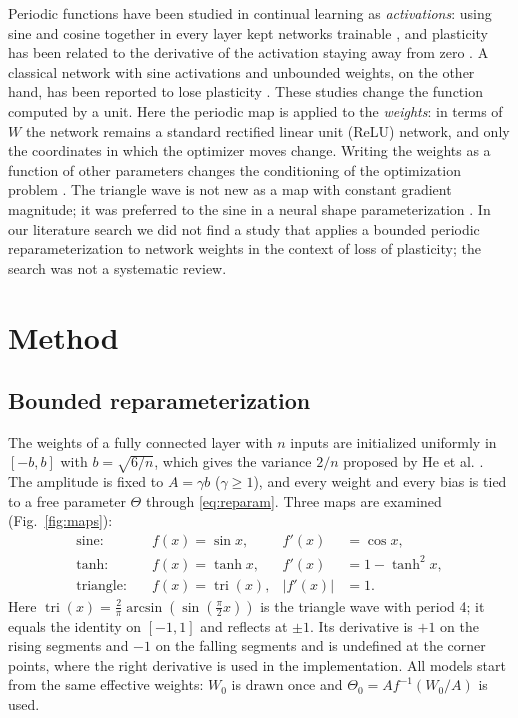 \documentclass[conference,a4paper]{IEEEtran}
\newcommand{\tri}{\operatorname{tri}}
\begin{document}
Periodic functions have been studied in continual learning as \emph{activations}: using sine and cosine together
in every layer kept networks trainable \cite{lewandowski2025fourier}, and plasticity has been related to the
derivative of the activation staying away from zero \cite{lillo2026activation}. A classical network with sine
activations and unbounded weights, on the other hand, has been reported to lose plasticity
\cite{chen2026intrinsic}. These studies change the function computed by a unit. Here the periodic map is
applied to the \emph{weights}: in terms of $W$ the network remains a standard rectified linear unit (ReLU) network, and only the
coordinates in which the optimizer moves change. Writing the weights as a function of other parameters changes the conditioning of the optimization problem \cite{salimans2016weight}. The triangle wave is
not new as a map with constant gradient magnitude; it was preferred to the sine in a neural shape
parameterization \cite{dai2025shaping}. In our literature search we did not find a study that applies a bounded
periodic reparameterization to network weights in the context of loss of plasticity; the search was not a systematic review.

\section{Method}

\subsection{Bounded reparameterization}

The weights of a fully connected layer with $n$ inputs are initialized uniformly in $[-b,b]$ with $b=\sqrt{6/n}$, which gives the variance $2/n$ proposed by He et al. \cite{he2015delving}. The amplitude is fixed to $A=\gamma b$ ($\gamma\ge1$), and every
weight and every bias is tied to a free parameter $\Theta$ through \eqref{eq:reparam}. Three maps are examined
(Fig.~\ref{fig:maps}):
\begin{align}
  \text{sine:}\quad & f(x)=\sin x, & f'(x)&=\cos x, \nonumber\\
  \text{tanh:}\quad & f(x)=\tanh x, & f'(x)&=1-\tanh^2 x, \nonumber\\
  \text{triangle:}\quad & f(x)=\tri(x), & |f'(x)|&=1 .
\end{align}
Here $\tri(x)=\tfrac{2}{\pi}\arcsin(\sin(\tfrac{\pi}{2}x))$ is the triangle wave with period 4; it equals the
identity on $[-1,1]$ and reflects at $\pm1$. Its derivative is $+1$ on the rising segments and $-1$ on the
falling segments and is undefined at the corner points, where the right derivative is used in the
implementation. All models start from the same effective weights: $W_0$ is drawn once and
$\Theta_0=A f^{-1}(W_0/A)$ is used.
\end{document}
